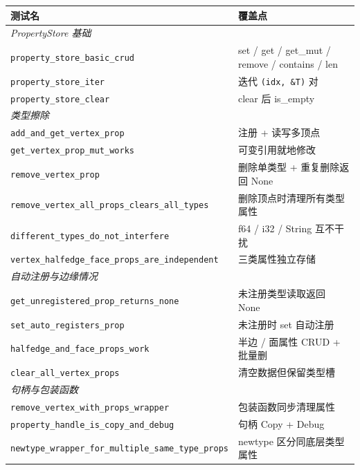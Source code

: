 \documentclass[11pt,a4paper]{article}
\begin{document}
\begin{center}
\scriptsize
\renewcommand{\arraystretch}{1.18}
\begin{tabular}{@{}ll@{}}
  \toprule
  \textbf{测试名} & \textbf{覆盖点} \\
  \midrule
  \multicolumn{2}{l}{\textit{PropertyStore 基础}} \\
  \texttt{property\_store\_basic\_crud}       & set / get / get\_mut / remove / contains / len \\
  \texttt{property\_store\_iter}              & 迭代 \texttt{(idx, \&T)} 对 \\
  \texttt{property\_store\_clear}             & clear 后 is\_empty \\
  \midrule
  \multicolumn{2}{l}{\textit{类型擦除}} \\
  \texttt{add\_and\_get\_vertex\_prop}        & 注册 + 读写多顶点 \\
  \texttt{get\_vertex\_prop\_mut\_works}      & 可变引用就地修改 \\
  \texttt{remove\_vertex\_prop}               & 删除单类型 + 重复删除返回 None \\
  \texttt{remove\_vertex\_all\_props\_clears\_all\_types} & 删除顶点时清理所有类型属性 \\
  \texttt{different\_types\_do\_not\_interfere} & f64 / i32 / String 互不干扰 \\
  \texttt{vertex\_halfedge\_face\_props\_are\_independent} & 三类属性独立存储 \\
  \midrule
  \multicolumn{2}{l}{\textit{自动注册与边缘情况}} \\
  \texttt{get\_unregistered\_prop\_returns\_none} & 未注册类型读取返回 None \\
  \texttt{set\_auto\_registers\_prop}         & 未注册时 set 自动注册 \\
  \texttt{halfedge\_and\_face\_props\_work}   & 半边 / 面属性 CRUD + 批量删 \\
  \texttt{clear\_all\_vertex\_props}          & 清空数据但保留类型槽 \\
  \midrule
  \multicolumn{2}{l}{\textit{句柄与包装函数}} \\
  \texttt{remove\_vertex\_with\_props\_wrapper} & 包装函数同步清理属性 \\
  \texttt{property\_handle\_is\_copy\_and\_debug} & 句柄 Copy + Debug \\
  \texttt{newtype\_wrapper\_for\_multiple\_same\_type\_props} & newtype 区分同底层类型属性 \\
  \bottomrule
\end{tabular}
\end{center}
\end{document}
